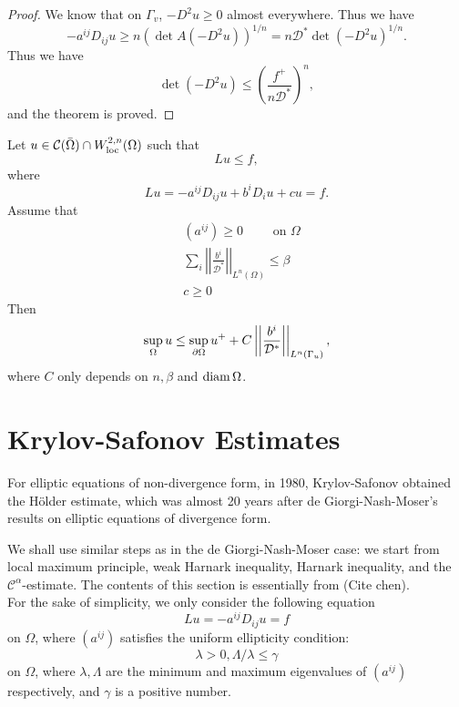 \begin{proof} We know that on $\Gamma_v$, $-D^2 u\geq 0$ almost everywhere. Thus we have
\[
-a^{ij}D_{ij} u\geq n(\det A(-D^2u))^{1/n}=n\mathcal D^*\det (-D^2 u)^{1/n}.
\]
Thus we have
\[
\det(-D^2 u)\leq\left(\frac{f^+}{n\mathcal D^*}\right)^n,
\]
and the theorem is proved.

\end{proof}

\begin{theorem} Let $u\in \mathcal C(\bar\Omega)\cap W_{{\rm loc}}^{2,n}(\Omega)$ 
such that
\[
Lu\leq f,
\]
where
\[
Lu=-a^{ij}D_{ij} u+b^i D_i u+cu=f.
\]
Assume that 
\begin{align*}
& (a^{ij})\geq 0\qquad \text{ on } \Omega\\
&\sum_i\left|\left|\frac{b^i}{\mathcal D^*}\right|\right|_{L^n(\Omega)}\leq\beta\\
& c\geq 0
\end{align*}
Then
\[
\sup_\Omega u\leq\sup_{\partial\Omega} u^++C\left|\left|\frac{b^i}{\mathcal D^*}\right|\right|_{L^n(\Gamma_u)},
\]
where $C$ only depends on $n,\beta$ and ${\rm diam}\,\Omega$.
\end{theorem}



\section{Krylov-Safonov Estimates}\label{Krylov-Safonov}
For elliptic equations of non-divergence form, in 1980, Krylov-Safonov obtained the H\"older estimate, which was almost 20 years after de Giorgi-Nash-Moser's results on elliptic equations of divergence form.

We shall use similar steps as in the de Giorgi-Nash-Moser case: we start from local maximum principle, weak Harnark inequality,  Harnark inequality, and the $\mathcal C^\alpha$-estimate. The contents of this section is essentially from (Cite chen).\\

For the sake of simplicity, we only consider  the following equation
\begin{equation}\label{div-2}
Lu=-a^{ij} D_{ij} u=f
\end{equation}
on $\Omega$, where $(a^{ij})$ satisfies the uniform ellipticity condition:
\begin{equation}\label{uni-4}
\lambda>0, \Lambda/\lambda\leq\gamma
\end{equation}
on $\Omega$, where $\lambda, \Lambda$ are the minimum and maximum eigenvalues of $(a^{ij})$
respectively, and $\gamma$ is a positive number.

